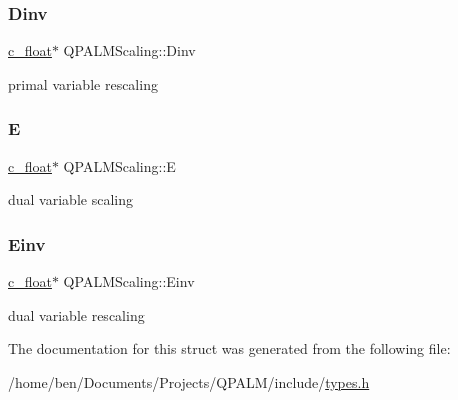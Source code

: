 \subsubsection{\texorpdfstring{Dinv}{Dinv}}
{\footnotesize\ttfamily \mbox{\hyperlink{global__opts_8h_a7f1a9fda95e52979658c20a0d134fb15}{c\+\_\+float}}$\ast$ Q\+P\+A\+L\+M\+Scaling\+::\+Dinv}



primal variable rescaling 

\mbox{\label{structQPALMScaling_a8e0f516b3576cb21c6775008f42a6b41}} 
\subsubsection{\texorpdfstring{E}{E}}
{\footnotesize\ttfamily \mbox{\hyperlink{global__opts_8h_a7f1a9fda95e52979658c20a0d134fb15}{c\+\_\+float}}$\ast$ Q\+P\+A\+L\+M\+Scaling\+::E}



dual variable scaling 

\mbox{\label{structQPALMScaling_a8e9adc9bd55190204f3d4f0a862e55cb}} 
\subsubsection{\texorpdfstring{Einv}{Einv}}
{\footnotesize\ttfamily \mbox{\hyperlink{global__opts_8h_a7f1a9fda95e52979658c20a0d134fb15}{c\+\_\+float}}$\ast$ Q\+P\+A\+L\+M\+Scaling\+::\+Einv}



dual variable rescaling 



The documentation for this struct was generated from the following file\+:\begin{DoxyCompactItemize}
\item 
/home/ben/\+Documents/\+Projects/\+Q\+P\+A\+L\+M/include/\mbox{\hyperlink{types_8h}{types.\+h}}\end{DoxyCompactItemize}
